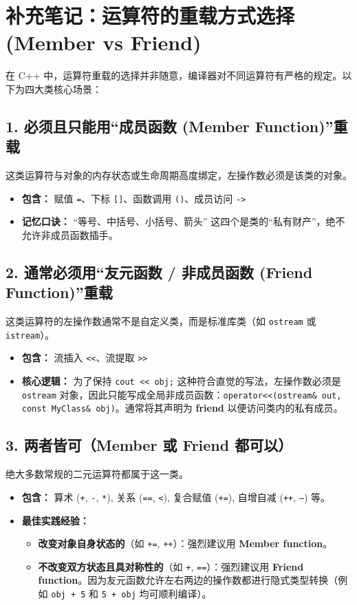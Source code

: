 \documentclass[11pt, a4paper]{article}
\begin{document}
\section*{补充笔记：运算符的重载方式选择 (Member vs Friend)}

在 C++ 中，运算符重载的选择并非随意，编译器对不同运算符有严格的规定。以下为四大类核心场景：

\vspace{1em}

\subsection*{1. 必须且只能用“成员函数 (Member Function)”重载}
这类运算符与对象的内存状态或生命周期高度绑定，左操作数必须是该类的对象。
\begin{itemize}
    \item \textbf{包含：} 赋值 \texttt{=}、下标 \texttt{[]}、函数调用 \texttt{()}、成员访问 \texttt{->}
    \item \textbf{记忆口诀：} “等号、中括号、小括号、箭头” 这四个是类的“私有财产”，绝不允许非成员函数插手。
\end{itemize}

\subsection*{2. 通常必须用“友元函数 / 非成员函数 (Friend Function)”重载}
这类运算符的左操作数通常不是自定义类，而是标准库类（如 \texttt{ostream} 或 \texttt{istream}）。
\begin{itemize}
    \item \textbf{包含：} 流插入 \texttt{<<}、流提取 \texttt{>>}
    \item \textbf{核心逻辑：} 为了保持 \texttt{cout << obj;} 这种符合直觉的写法，左操作数必须是 \texttt{ostream} 对象，因此只能写成全局非成员函数：\texttt{operator<<(ostream\& out, const MyClass\& obj)}。通常将其声明为 \textbf{friend} 以便访问类内的私有成员。
\end{itemize}

\subsection*{3. 两者皆可（Member 或 Friend 都可以）}
绝大多数常规的二元运算符都属于这一类。
\begin{itemize}
    \item \textbf{包含：} 算术 (\texttt{+}, \texttt{-}, \texttt{*}), 关系 (\texttt{==}, \texttt{<}), 复合赋值 (\texttt{+=}), 自增自减 (\texttt{++}, \texttt{--}) 等。
    \item \textbf{最佳实践经验：} 
    \begin{itemize}
        \item \textbf{改变对象自身状态的}（如 \texttt{+=}, \texttt{++}）：强烈建议用 \textbf{Member function}。
        \item \textbf{不改变双方状态且具对称性的}（如 \texttt{+}, \texttt{==}）：强烈建议用 \textbf{Friend function}。因为友元函数允许左右两边的操作数都进行隐式类型转换（例如 \texttt{obj + 5} 和 \texttt{5 + obj} 均可顺利编译）。
    \end{itemize}
\end{itemize}
\end{document}
